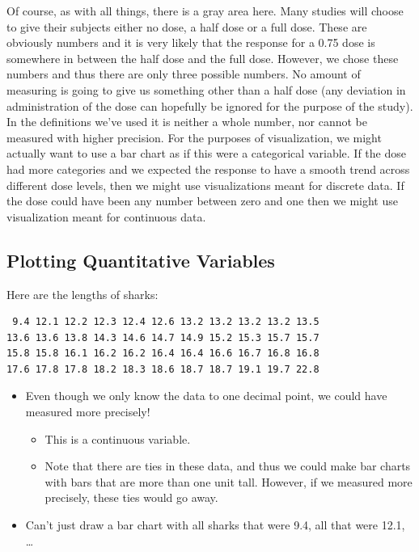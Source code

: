 \documentclass[
  letterpaper,
  DIV=11,
  numbers=noendperiod,
  oneside]{scrreprt}
\providecommand{\tightlist}{%
  \setlength{\itemsep}{0pt}\setlength{\parskip}{0pt}}\usepackage{longtable,booktabs,array}
\begin{document}
Of course, as with all things, there is a gray area here. Many studies
will choose to give their subjects either no dose, a half dose or a full
dose. These are obviously numbers and it is very likely that the
response for a 0.75 dose is somewhere in between the half dose and the
full dose. However, we chose these numbers and thus there are only three
possible numbers. No amount of measuring is going to give us something
other than a half dose (any deviation in administration of the dose can
hopefully be ignored for the purpose of the study). In the definitions
we've used it is neither a whole number, nor cannot be measured with
higher precision. For the purposes of visualization, we might actually
want to use a bar chart as if this were a categorical variable. If the
dose had more categories and we expected the response to have a smooth
trend across different dose levels, then we might use visualizations
meant for discrete data. If the dose could have been any number between
zero and one then we might use visualization meant for continuous data.

\hypertarget{plotting-quantitative-variables}{%
\subsection{Plotting Quantitative
Variables}\label{plotting-quantitative-variables}}

Here are the lengths of sharks:

\begin{verbatim}
 9.4 12.1 12.2 12.3 12.4 12.6 13.2 13.2 13.2 13.2 13.5
13.6 13.6 13.8 14.3 14.6 14.7 14.9 15.2 15.3 15.7 15.7
15.8 15.8 16.1 16.2 16.2 16.4 16.4 16.6 16.7 16.8 16.8
17.6 17.8 17.8 18.2 18.3 18.6 18.7 18.7 19.1 19.7 22.8
\end{verbatim}

\begin{itemize}
\tightlist
\item
  Even though we only know the data to one decimal point, we could have
  measured more precisely!

  \begin{itemize}
  \tightlist
  \item
    This is a continuous variable.
  \item
    Note that there are ties in these data, and thus we could make bar
    charts with bars that are more than one unit tall. However, if we
    measured more precisely, these ties would go away.
  \end{itemize}
\item
  Can't just draw a bar chart with all sharks that were 9.4, all that
  were 12.1, \ldots{}
\end{itemize}
\end{document}
